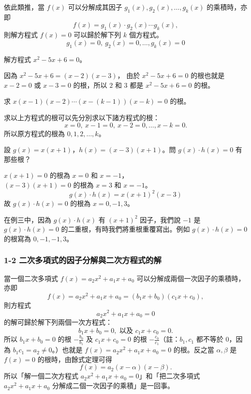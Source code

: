 依此類推，當 $f(x)$ 可以分解成其因子 $g_1(x), g_2(x), \dots, g_k(x)$ 的乘積時，亦即
\[
f(x)=g_1(x)\cdot g_2(x)\dotsm g_k(x),
\]
則解方程式 $f(x)=0$ 可以歸於解下列 $k$ 個方程式。
\[
g_1(x)=0,\ g_2(x)=0, \dots, g_k(x)=0
\]

\begin{example}\label{ex:b2_1-1-1}
解方程式 $x^2-5x+6=0$。
\end{example}
因為 $x^2-5x+6=(x-2)(x-3)$，
由於 $x^2-5x+6=0$ 的根也就是 $x-2=0$ 或 $x-3=0$ 的根，所以 $2$ 和 $3$ 都是 $x^2-5x+6=0$ 的根。

\begin{example}\label{ex:b2_1-1-2}
求 $x(x-1)(x-2)\dotsm(x-(k-1))(x-k)=0$ 的根。
\end{example}
求以上方程式的根可以先分別求以下諸方程式的根：
\[
x=0,\ x-1=0,\ x-2=0,\dots,x-k=0.
\]
所以原方程式的根為 $0, 1, 2, \dots, k$。

\begin{example}\label{ex:b2_1-1-3}
設 $g(x)=x(x+1)$，$h(x)=(x-3)(x+1)$。問 $g(x)\cdot h(x)=0$ 有那些根？
\end{example}
$x(x+1)=0$ 的根為 $x=0$ 和 $x=-1$，\\
$(x-3)(x+1)=0$ 的根為 $x=3$ 和 $x=-1$。\\
\[
g(x)\cdot h(x)=x(x+1)^2(x-3)
\]
故 $g(x)\cdot h(x)=0$ 的根為 $x=0, -1, 3$。

在例三中\label{note:b2-ch1-ex3}，因為 $g(x)\cdot h(x)$ 有 $(x+1)^2$ 因子，我們說 $-1$ 是 $g(x)\cdot h(x)=0$ 的二重根，有時我們將重根重覆寫出。例如 $g(x)\cdot h(x)=0$ 的根寫為 $0, -1, -1, 3$。

\subsubsection*{1-2 二次多項式的因子分解與二次方程式的解}

當一個二次多項式 $f(x)=a_2 x^2 + a_1 x + a_0$ 可以分解成兩個一次因子的乘積時，亦即
\[
f(x)=a_2 x^2 + a_1 x + a_0 = (b_1 x + b_0)(c_1 x + c_0),
\]
則方程式
\[
a_2 x^2 + a_1 x + a_0 = 0
\]
的解可歸於解下列兩個一次方程式：
\[
b_1 x + b_0 = 0, \text{ 以及 } c_1 x + c_0 = 0.
\]
所以 $b_1 x + b_0 = 0$ 的根 $-\frac{b_0}{b_1}$ 及 $c_1 x + c_0 = 0$ 的根 $-\frac{c_0}{c_1}$（註：$b_1, c_1$ 都不等於 $0$，因為 $b_1 c_1 = a_2 \ne 0$。）也就是 $f(x)=a_2 x^2 + a_1 x + a_0 = 0$ 的根。反之當 $\alpha, \beta$ 是 $f(x)=0$ 的根時，由餘式定理可得
\[
f(x)=a_2(x-\alpha)(x-\beta).
\]
所以「解一個二次方程式 $a_2 x^2 + a_1 x + a_0 = 0$」和「把二次多項式 $a_2 x^2 + a_1 x + a_0$ 分解成二個一次因子的乘積」是一回事。

